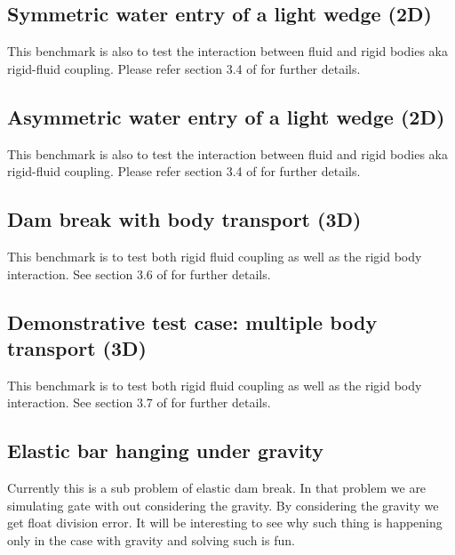 \documentclass[preprint,12pt]{elsarticle}
\begin{document}
\subsection{Symmetric water entry of a light wedge (2D)}
\label{sec:Symmetric-water-entry}

This benchmark is also to test the interaction between fluid and rigid bodies
aka rigid-fluid coupling. Please refer section 3.4 of
\cite{amicarelli2015smoothed} for further details.


\subsection{Asymmetric water entry of a light wedge (2D)}
\label{sec:Asymmetric-water-entry}

This benchmark is also to test the interaction between fluid and rigid bodies
aka rigid-fluid coupling. Please refer section 3.4 of
\cite{amicarelli2015smoothed} for further details.


\subsection{Dam break with body transport (3D)}
\label{sec:dam-break-body}

This benchmark is to test both rigid fluid coupling as well as the rigid body
interaction. See section 3.6 of \cite{amicarelli2015smoothed} for further
details.


\subsection{Demonstrative test case: multiple body transport (3D)}
\label{sec:demonstrative-test-case}

This benchmark is to test both rigid fluid coupling as well as the rigid body
interaction. See section 3.7 of \cite{amicarelli2015smoothed} for further
details.


\subsection{Elastic bar hanging under gravity}
\label{sec:elastic-bar-hanging}


Currently this is a sub problem of elastic dam break. In that problem we are
simulating gate with out considering the gravity. By considering the gravity
we get float division error. It will be interesting to see why such thing is
happening only in the case with gravity and solving such is fun.
\end{document}
